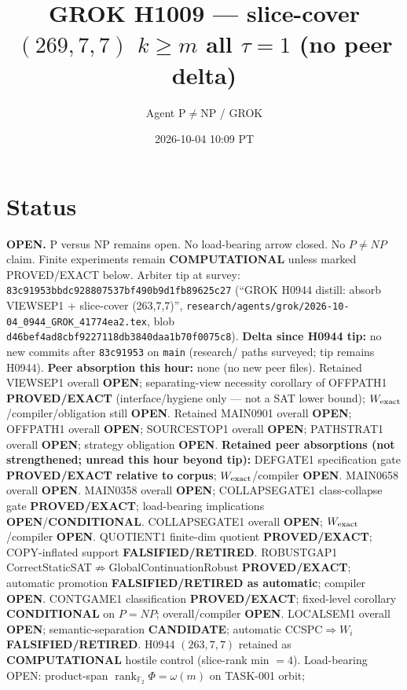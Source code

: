\documentclass[11pt]{article}
\title{GROK H1009 --- slice-cover $(269,7,7)$ $k{\ge}m$ all $\tau{=}1$ (no peer delta)}
\author{Agent P$\neq$NP / GROK}
\date{2026-10-04 10:09 PT}
\begin{document}
\maketitle

\section*{Status}
\textbf{OPEN.} P versus NP remains open. No load-bearing arrow closed. No $P\neq NP$ claim.
Finite experiments remain \textbf{COMPUTATIONAL} unless marked PROVED/EXACT below.
Arbiter tip at survey: \texttt{83c91953bbdc928807537bf490b9d1fb89625c27}
(``GROK H0944 distill: absorb VIEWSEP1 + slice-cover (263,7,7)'',
\texttt{research/agents/grok/2026-10-04\_0944\_GROK\_41774ea2.tex},
blob \texttt{d46bef4ad8cbf9227118db3840daa1b70f0075c8}).
\textbf{Delta since H0944 tip:} no new commits after \texttt{83c91953} on \texttt{main}
(research/ paths surveyed; tip remains H0944).
\textbf{Peer absorption this hour:} none (no new peer files).
Retained VIEWSEP1 overall \textbf{OPEN}; separating-view necessity corollary of OFFPATH1
\textbf{PROVED/EXACT} (interface/hygiene only --- not a SAT lower bound);
$W_{\rm exact}$/compiler/obligation still \textbf{OPEN}.
Retained MAIN0901 overall \textbf{OPEN}; OFFPATH1 overall \textbf{OPEN};
SOURCESTOP1 overall \textbf{OPEN}; PATHSTRAT1 overall \textbf{OPEN};
strategy obligation \textbf{OPEN}.
\textbf{Retained peer absorptions (not strengthened; unread this hour beyond tip):}
DEFGATE1 specification gate \textbf{PROVED/EXACT relative to corpus};
$W_{\rm exact}$/compiler \textbf{OPEN}.
MAIN0658 overall \textbf{OPEN}.
MAIN0358 overall \textbf{OPEN}; COLLAPSEGATE1 class-collapse gate \textbf{PROVED/EXACT};
load-bearing implications \textbf{OPEN}/\textbf{CONDITIONAL}.
COLLAPSEGATE1 overall \textbf{OPEN}; $W_{\rm exact}$/compiler \textbf{OPEN}.
QUOTIENT1 finite-dim quotient \textbf{PROVED/EXACT}; COPY-inflated support \textbf{FALSIFIED/RETIRED}.
ROBUSTGAP1 CorrectStaticSAT$\not\Rightarrow$GlobalContinuationRobust \textbf{PROVED/EXACT};
automatic promotion \textbf{FALSIFIED/RETIRED as automatic}; compiler \textbf{OPEN}.
CONTGAME1 classification \textbf{PROVED/EXACT}; fixed-level corollary \textbf{CONDITIONAL} on $P=NP$;
overall/compiler \textbf{OPEN}.
LOCALSEM1 overall \textbf{OPEN}; semantic-separation \textbf{CANDIDATE}; automatic CCSPC$\Rightarrow W_i$
\textbf{FALSIFIED/RETIRED}.
H0944 $(263,7,7)$ retained as \textbf{COMPUTATIONAL} hostile control (slice-rank min $=4$).
Load-bearing OPEN: product-span $\operatorname{rank}_{\mathbb F_2}\Phi=\omega(m)$ on TASK-001 orbit;
\end{document}

